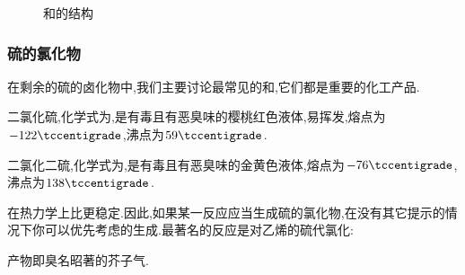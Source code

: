 \documentclass{ctexart}
\begin{document}
\begin{enumerate}[label=\tbf{\arabic*},topsep=0pt,parsep=0pt,itemsep=0pt,partopsep=0pt]
\begin{figure}[H]
{\begin{minipage}[b]{.45\linewidth}
                \end{minipage}
            }
            \caption{和的结构}
        \end{figure}
\end{enumerate}
\subsubsection{硫的氯化物}
在剩余的硫的卤化物中,我们主要讨论最常见的和,它们都是重要的化工产品.
\begin{substance}[\ce{SCl2}]
    二氯化硫,化学式为,是有毒且有恶臭味的樱桃红色液体,易挥发,熔点为$-122\tccentigrade$,沸点为$59\tccentigrade$.
\end{substance}
\begin{substance}[\ce{S2Cl2}]
    二氯化二硫,化学式为,是有毒且有恶臭味的金黄色液体,熔点为$-76\tccentigrade$,沸点为$138\tccentigrade$.
\end{substance}
在热力学上比更稳定.因此,如果某一反应应当生成硫的氯化物,在没有其它提示的情况下你可以优先考虑的生成.最著名的反应是对乙烯的硫代氯化:
\begin{center}
\end{center}
产物即臭名昭著的芥子气.
\end{document}
